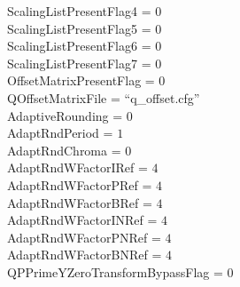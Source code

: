 ScalingListPresentFlag4  = $0$ \\
ScalingListPresentFlag5  = $0$ \\
ScalingListPresentFlag6  = $0$ \\
ScalingListPresentFlag7  = $0$ \\
OffsetMatrixPresentFlag  = $0$ \\
QOffsetMatrixFile        = ``q\_offset.cfg'' \\
AdaptiveRounding         = $0$ \\
AdaptRndPeriod           = $1$ \\
AdaptRndChroma           = $0$ \\
AdaptRndWFactorIRef      = $4$ \\
AdaptRndWFactorPRef      = $4$ \\
AdaptRndWFactorBRef      = $4$ \\
AdaptRndWFactorINRef     = $4$ \\
AdaptRndWFactorPNRef     = $4$ \\
AdaptRndWFactorBNRef     = $4$ \\
QPPrimeYZeroTransformBypassFlag = $0$
